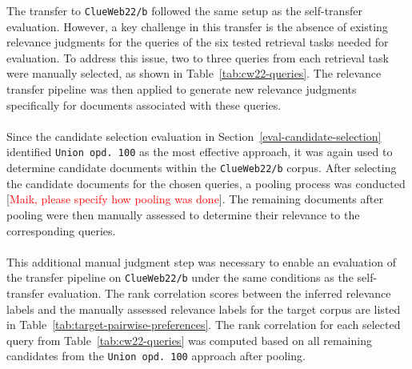 The transfer to \texttt{ClueWeb22/b} followed the same setup as the self-transfer evaluation. However, a key challenge in this transfer is the absence of existing relevance judgments for the queries of the six tested retrieval tasks needed for evaluation. To address this issue, two to three queries from each retrieval task were manually selected, as shown in Table~\ref{tab:cw22-queries}. The relevance transfer pipeline was then applied to generate new relevance judgments specifically for documents associated with these queries.
\\\\
Since the candidate selection evaluation in Section~\ref{eval-candidate-selection} identified \linebreak \mbox{\texttt{Union opd.\ 100}} as the most effective approach, it was again used to determine candidate documents within the \texttt{ClueWeb22/b} corpus. After selecting the candidate documents for the chosen queries, a pooling process was conducted [\textcolor{red}{Maik, please specify how pooling was done}]. The remaining documents after pooling were then manually assessed to determine their relevance to the corresponding queries.
\\\\
This additional manual judgment step was necessary to enable an evaluation of the transfer pipeline on \texttt{ClueWeb22/b} under the same conditions as the self-transfer evaluation. The rank correlation scores between the inferred relevance labels and the manually assessed relevance labels for the target corpus are listed in Table~\ref{tab:target-pairwise-preferences}. The rank correlation for each selected query from Table~\ref{tab:cw22-queries} was computed based on all remaining candidates from the \texttt{Union opd.\ 100} approach after pooling.